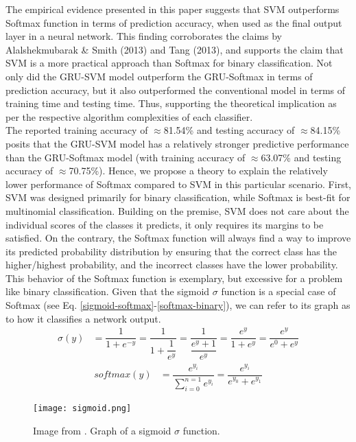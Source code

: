The empirical evidence presented in this paper suggests that SVM outperforms Softmax function in terms of prediction accuracy, when used as the final output layer in a neural network. This finding corroborates the claims by Alalshekmubarak \& Smith (2013)\cite{Alalshekmubarak} and Tang (2013)\cite{Tang}, and supports the claim that SVM is a more practical approach than Softmax for binary classification. Not only did the GRU-SVM model outperform the GRU-Softmax in terms of prediction accuracy, but it also outperformed the conventional model in terms of training time and testing time. Thus, supporting the theoretical implication as per the respective algorithm complexities of each classifier.\\
\indent	The reported training accuracy of $\approx$81.54\% and testing accuracy of $\approx$84.15\% posits that the GRU-SVM model has a relatively stronger predictive performance than the GRU-Softmax model (with training accuracy of $\approx$63.07\% and testing accuracy of $\approx$70.75\%). Hence, we propose a theory to explain the relatively lower performance of Softmax compared to SVM in this particular scenario. First, SVM was designed primarily for binary classification\cite{Cortes}, while Softmax is best-fit for multinomial classification\cite{Karpathy}. Building on the premise, SVM does not care about the individual scores of the classes it predicts, it only requires its margins to be satisfied\cite{Karpathy}. On the contrary, the Softmax function will always find a way to improve its predicted probability distribution by ensuring that the correct class has the higher/highest probability, and the incorrect classes have the lower probability. This behavior of the Softmax function is exemplary, but excessive for a problem like binary classification. Given that the sigmoid $\sigma$ function is a special case of Softmax (see Eq. \ref{sigmoid-softmax}-\ref{softmax-binary}), we can refer to its graph as to how it classifies a network output.
\begin{align}\label{sigmoid-softmax}
\sigma(y)	&=	\dfrac{1}{1 + e^{-y}}	=	\dfrac{1}{1 + \dfrac{1}{e^{y}}}	=	\dfrac{1}{\dfrac{e^{y} + 1}{e^{y}}}	=	\dfrac{e^{y}}{1 + e^{y}}	=	\dfrac{e^{y}}{e^{0}+e^{y}}
\end{align}
\begin{align}\label{softmax-binary}
softmax(y)	&=	\dfrac{e^{y_{i}}}{\sum_{i=0}^{n=1} e^{y_{i}}}	=	\dfrac{e^{y_{i}}}{e^{y_{0}} + e^{y_{1}}}
\end{align}

\begin{figure}
\centering
	\texttt{[image: sigmoid.png]}
	\caption{Image from \cite{45793856}. Graph of a sigmoid $\sigma$ function.}
	\label{sigmoid-graph}
\endminipage\hfill
\end{figure}

